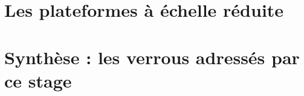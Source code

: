 \section{Les plateformes à échelle réduite}

\section{Synthèse : les verrous adressés par ce stage}
